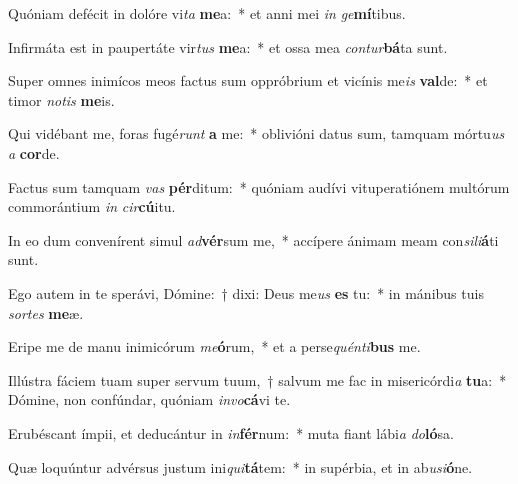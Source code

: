 \item Quóniam defécit in dolóre vi\textit{ta} \textbf{me}a:~* et anni mei \textit{in} \textit{ge}\textbf{mí}tibus.
\item Infirmáta est in paupertáte vir\textit{tus} \textbf{me}a:~* et ossa mea \textit{con}\textit{tur}\textbf{bá}ta sunt.
\item Super omnes inimícos meos factus sum oppróbrium et vicínis me\textit{is} \textbf{val}de:~* et timor \textit{no}\textit{tis} \textbf{me}is.
\item Qui vidébant me, foras fugé\textit{runt} \textbf{a} me:~* oblivióni datus sum, tamquam mórtu\textit{us} \textit{a} \textbf{cor}de.
\item Factus sum tamquam \textit{vas} \textbf{pér}ditum:~* quóniam audívi vituperatiónem multórum commorántium \textit{in} \textit{cir}\textbf{cú}itu.
\item In eo dum convenírent simul \textit{ad}\textbf{vér}sum me,~* accípere ánimam meam con\textit{si}\textit{li}\textbf{á}ti sunt.
\item Ego autem in te sperávi, Dómine:~† dixi: Deus me\textit{us} \textbf{es} tu:~* in mánibus tuis \textit{sor}\textit{tes} \textbf{me}æ.
\item Eripe me de manu inimicórum \textit{me}\textbf{ó}rum,~* et a perse\textit{quén}\textit{ti}\textbf{bus} me.
\item Illústra fáciem tuam super servum tuum,~† salvum me fac in misericórdi\textit{a} \textbf{tu}a:~* Dómine, non confúndar, quóniam \textit{in}\textit{vo}\textbf{cá}vi te.
\item Erubéscant ímpii, et deducántur in \textit{in}\textbf{fér}num:~* muta fiant lábi\textit{a} \textit{do}\textbf{ló}sa.
\item Quæ loquúntur advérsus justum ini\textit{qui}\textbf{tá}tem:~* in supérbia, et in ab\textit{u}\textit{si}\textbf{ó}ne.
